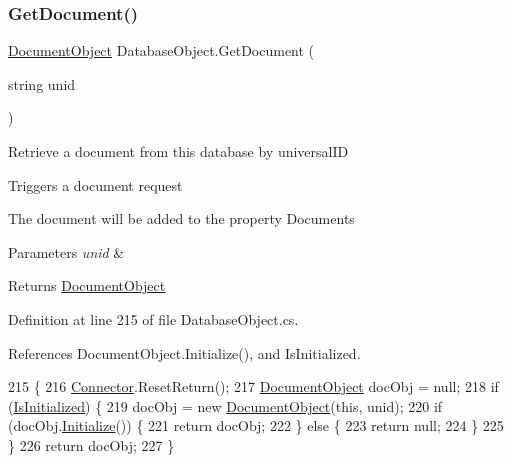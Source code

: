\subsubsection{\texorpdfstring{Get\+Document()}{GetDocument()}}
{\footnotesize\ttfamily \mbox{\hyperlink{class_document_object}{Document\+Object}} Database\+Object.\+Get\+Document (\begin{DoxyParamCaption}\item[{string}]{unid }\end{DoxyParamCaption})}



Retrieve a document from this database by universal\+ID 

Triggers a document request

The document will be added to the property \textquotesingle{}Documents\textquotesingle{}


\begin{DoxyParams}{Parameters}
{\em unid} & \\
\hline
\end{DoxyParams}
\begin{DoxyReturn}{Returns}
\mbox{\hyperlink{class_document_object}{Document\+Object}}
\end{DoxyReturn}


Definition at line 215 of file Database\+Object.\+cs.



References Document\+Object.\+Initialize(), and Is\+Initialized.


\begin{DoxyCode}
215                                                    \{
216         \mbox{\hyperlink{class_connector}{Connector}}.ResetReturn();
217         \mbox{\hyperlink{class_document_object}{DocumentObject}} docObj = null;
218         \textcolor{keywordflow}{if} (\mbox{\hyperlink{class_database_object_a5fe036d32a30eb10d1b3f6a30263f740}{IsInitialized}}) \{
219             docObj = \textcolor{keyword}{new} \mbox{\hyperlink{class_document_object}{DocumentObject}}(\textcolor{keyword}{this}, unid);
220             \textcolor{keywordflow}{if}  (docObj.\mbox{\hyperlink{class_document_object_af4298d6cfbb9ea60643d9995309b73f1}{Initialize}}()) \{
221                 \textcolor{keywordflow}{return} docObj;
222             \} \textcolor{keywordflow}{else} \{
223                 \textcolor{keywordflow}{return} null;
224             \}
225         \}
226         \textcolor{keywordflow}{return} docObj;
227     \}
\end{DoxyCode}
\mbox{\label{class_database_object_a9be31ba852e56a107e93f7d925f8a0c3}} 

